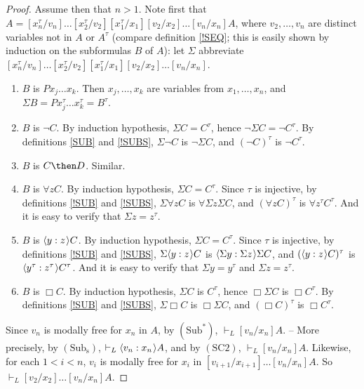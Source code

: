 \documentclass[11pt]{woarticle}
\newcommand{\cmnt}[1]{\iffalse #1 \fi}
\theoremstyle{break}
\theoremstyle{nonumberplain}
\newcommand{\1}{\;\,|\;\,}
\renewcommand{\t}[1]{\ensuremath{\langle #1  \makebox[.2ex]{}\rangle}}
\newcommand{\T}[1]{\ensuremath{(\mathrm{ #1})}}
\begin{document}
\begin{proof}
{    Assume then that $n > 1$. Note first that $A =
    [x_{n}^\tau/v_{n}]\ldots[x_2^\tau/v_2][x_1^\tau/x_1][v_2/x_2]\ldots[v_n/x_n]A$,
    where $v_2,\ldots,v_n$ are distinct variables not in $A$ or
    $A^\tau$ (compare definition \ref{!SEQ}; this is easily shown by
    induction on the subformulas $B$ of $A$): let $\Sigma$ abbreviate
    $[x_{n}^\tau/v_{n}]\ldots[x_2^\tau/v_2][x_1^\tau/x_1][v_2/x_2]\ldots[v_n/x_n]$.
    \begin{enumerate}
    \item $B$ is $Px_j\ldots x_k$.\; Then $x_j,\ldots, x_k$ are
      variables from $x_1,\ldots,x_n$, and $\Sigma B = Px_j^\tau\ldots
      x_k^\tau = B^\tau$.
    \item $B$ is $\neg C$.\; By induction hypothesis, $\Sigma C =
      C^\tau$, hence $\neg \Sigma C = \neg C^\tau$. By definitions
      \ref{SUB} and \ref{!SUBS}, $\Sigma \neg C$ is $\neg \Sigma C$, and
      $(\neg C)^\tau$ is $\neg C^\tau$.
    \item $B$ is $C \then D$.\; Similar.
    \item $B$ is $\forall z C$.\; By induction hypothesis, $\Sigma C =
      C^\tau$. Since $\tau$ is injective, by definitions \ref{!SUB} and
      \ref{!SUBS}, $\Sigma \forall z C$ is $\forall \Sigma z \Sigma C$,
      and $(\forall z C)^\tau$ is $\forall z^\tau C^\tau$. \cmnt{(Here
        things would get a lot more complicated if we had defined
        substitution differently, so that $[y/x]\forall x Fx \not=
        \forall y Fy$.)} And it is easy to verify that $\Sigma z =
      z^\tau$.
    \item $B$ is $\t{y:z} C$.\; By induction hypothesis, $\Sigma C =
      C^\tau$. Since $\tau$ is injective, by definitions \ref{!SUB}
      and \ref{!SUBS}, $\Sigma \t{y:z} C$ is $\t{\Sigma y: \Sigma z}
      \Sigma C$, and $(\t{y:z} C)^\tau$ is $\t{y^\tau:z^\tau}
      C^\tau$. And it is easy to verify that $\Sigma y = y^\tau$ and
      $\Sigma z = z^\tau$.
    \item $B$ is $\Box C$.\; By induction hypothesis, $\Sigma C$ is
      $C^\tau$, hence $\Box \Sigma C$ is $\Box C^\tau$. By definitions
      \ref{!SUB} and \ref{!SUBS}, $\Sigma \Box C$ is $\Box \Sigma C$,
      and $(\Box C)^\tau$ is $\Box C^\tau$.
    \end{enumerate}
    
    Since $v_n$ is modally free for $x_n$ in $A$, by \T{Sub^*},
    $\vdash_{L} [v_n/x_n]A$. -- More precisely, by \T{Sub_s},
    $\vdash_L \t{v_n:x_n}A$, and by \T{SC2}, $\vdash_L
    [v_n/x_n]A$. Likewise, for each $1 < i < n$, $v_i$ is modally free
    for $x_i$ in $[v_{i+1}/x_{i+1}]\ldots [v_n/x_n]A$. So $\vdash_{L}
    [v_2/x_2]\ldots[v_n/x_n]A$.

}
\end{proof}
\end{document}
